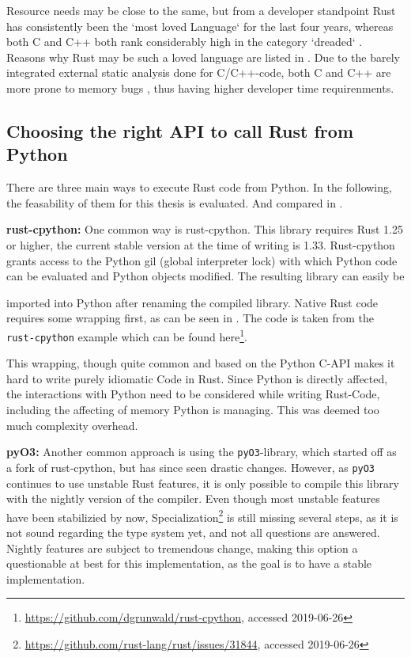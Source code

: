 Resource needs may be close to the same, but from a developer standpoint Rust
has consistently been the `most loved Language` \cite{rustloved} for the last
four years, whereas both C and C++ both rank considerably high in the category
`dreaded` \cite{rustloved}. Reasons why Rust may be such a loved language are
listed in . Due to the barely integrated external
static analysis done for C/C++-code, both C and C++ are more prone to memory
bugs \cite{pronememory}, thus having higher developer time requirenments.





\subsection{Choosing the right API to call Rust from Python}\label{sec:api}

There are three main ways to execute Rust code from Python. In the following,
the feasability of them for this thesis is evaluated. And compared in
.

\begin{stretchpars}
\textbf{rust-cpython:} One common way is rust-cpython. This library requires
Rust 1.25 or higher, the current stable version at the time of writing is 1.33.
Rust-cpython grants access to the Python gil (global interpreter lock) with
which Python code can be evaluated and Python objects modified. The resulting
library can easily be
\end{stretchpars}


imported into Python after renaming the compiled library. Native Rust code
requires some wrapping first, as can be seen in . The code is
taken from the \verb|rust-cpython| example which can be found
here\footnote{\url{https://github.com/dgrunwald/rust-cpython}, accessed
2019-06-26}. 

This wrapping, though quite common and based on the Python C-API makes
it hard to write purely idiomatic Code in Rust. Since Python is directly
affected, the interactions with Python need to be considered while writing
Rust-Code, including the affecting of memory Python is managing. This was
deemed too much complexity overhead.


\textbf{pyO3:} Another common approach is using the \verb|pyO3|-library, which
started off as a fork of rust-cpython, but has since seen drastic changes.
However, as \verb|pyO3| continues to use unstable Rust features, it is only
possible to compile this library with the nightly version of the compiler. Even
though most unstable features have been stabilizied by now,
Specialization\footnote{\url{https://github.com/rust-lang/rust/issues/31844},
accessed 2019-06-26} is still missing several steps, as it is not sound
regarding the type system yet, and not all questions are answered. Nightly
features are subject to tremendous change, making this option a questionable at
best for this implementation, as the goal is to have a stable implementation.


